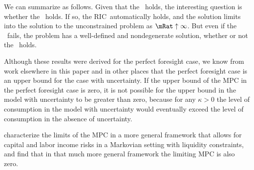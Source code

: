 \documentclass[\econtexRoot/BufferStockTheory]{subfiles}
\begin{document}
We can summarize as follows.  Given that the \GICRaw~holds, the
interesting question is whether the \FHWC~holds.  If so, the
RIC~automatically holds, and the solution limits
into the solution to the unconstrained problem as $\mRat \uparrow
\infty$.  But even if the \FHWC~fails, the problem has a
well-defined and nondegenerate solution, whether or not the \RIC~holds.

Although these results were derived for the perfect foresight case,
we know from work elsewhere in this paper and in other places that the
perfect foresight case is an upper bound for the case with uncertainty.
If the upper bound of the MPC in the perfect foresight case is zero, it
is not possible for the upper bound in the model with uncertainty to be
greater than zero, because for any $\kappa > 0$ the level of consumption
in the model with uncertainty would eventually exceed the level of consumption
in the absence of uncertainty.

\cite{maTodaRich} characterize the limits of the MPC in a more general framework that allows for capital and labor income risks in a Markovian setting with liquidity constraints, and find that in that much more general framework the limiting MPC is also zero.%

\onlyinsubfile{\pagebreak}
\end{document}
